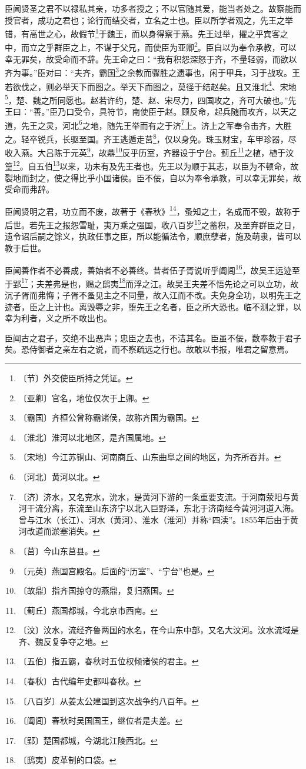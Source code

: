 \documentclass[12pt,UTF-8,openany,a4]{ctexbook}
\begin{document}
\begin{large}
    臣闻贤圣之君不以禄私其亲，功多者授之；不以官随其爱，能当者处之。故察能而授官者，成功之君也；论行而结交者，立名之士也。臣以所学者观之，先王之举错，有高世之心，故假节\footnote{〔节〕\yiwen 外交使臣所持之凭证。}于魏王，而以身得察于燕。先王过举，擢之乎宾客之中，而立之乎群臣之上，不谋于父兄，而使臣为亚卿\footnote{〔亚卿〕\yiwen 官名，地位仅次于上卿。}。臣自以为奉令承教，可以幸无罪矣，故受命而不辞。先王命之曰：“我有积怨深怒于齐，不量轻弱，而欲以齐为事。”臣对曰：“夫齐，霸国\footnote{〔霸国〕\yiwen 齐桓公曾称霸诸侯，故称齐国为霸国。}之余教而骤胜之遗事也，闲于甲兵，习于战攻。王若欲伐之，则必举天下而图之。举天下而图之，莫径于结赵矣。且又淮北\footnote{〔淮北〕\yiwen 淮河以北地区，是齐国属地。}、宋地\footnote{〔宋地〕\yiwen 今江苏铜山、河南商丘、山东曲阜之间的地区，为齐所吞并。}，楚、魏之所同愿也。赵若许约，楚、赵、宋尽力，四国攻之，齐可大破也。”先王曰：“善。”臣乃口受令，具符节，南使臣于赵。顾反命，起兵随而攻齐，以天之道，先王之灵，河北\footnote{〔河北〕\yiwen 黄河以北。}之地，随先王举而有之于济\footnote{〔济〕\yiwen 济水，又名兖水，沇水，是黄河下游的一条重要支流。于河南荥阳与黄河干流分离，东流至山东济宁以北入巨野泽，东北于济南经今黄河河道入海。曾与江水（长江）、河水（黄河）、淮水（淮河）并称“四渎”。1855年后由于黄河改道而淤塞消失。}上。济上之军奉令击齐，大胜之。轻卒锐兵，长驱至国。齐王逃遁走莒\footnote{〔莒〕\yiwen \yiwen 今山东莒县。}，仅以身免。珠玉财宝，车甲珍器，尽收入燕。大吕陈于元英\footnote{〔元英〕\yiwen 燕国宫殿名。后面的“历室”、“宁台”也是。}，故鼎\footnote{〔故鼎〕\yiwen 指齐国掠夺的燕鼎，复归燕国。}反乎历室，齐器设于宁台。蓟丘\footnote{〔蓟丘〕\yiwen 燕国都城，今北京市西南。}之植，植于汶篁\footnote{〔汶〕\yiwen 汶水，流经齐鲁两国的水名，在今山东中部，又名大汶河。汶水流域是齐、魏反复争夺之地。}。自五伯\footnote{〔五伯〕\yiwen 指五霸，春秋时五位权倾诸侯的君主。}以来，功未有及先王者也。先王以为顺于其志，以臣为不顿命，故裂地而封之，使之得比乎小国诸侯。臣不佞，自以为奉令承教，可以幸无罪矣，故受命而弗辞。
    
    臣闻贤明之君，功立而不废，故著于《春秋》\footnote{〔春秋〕\yiwen 古代编年史都叫春秋。}，蚤知之士，名成而不毁，故称于后世。若先王之报怨雪耻，夷万乘之强国，收八百岁\footnote{〔八百岁〕\yiwen 从姜太公建国到这次战争约八百年。}之蓄积，及至弃群臣之日，遗令诏后嗣之馀义，执政任事之臣，所以能循法令，顺庶孽者，施及萌隶，皆可以教于后世。
    
    臣闻善作者不必善成，善始者不必善终。昔者伍子胥说听乎阖闾\footnote{〔阖闾〕\yiwen 春秋时吴国国王，继位者是夫差。}，故吴王远迹至于郢\footnote{〔郢〕\yiwen 楚国都城，今湖北江陵西北。}；夫差弗是也，赐之鸱夷\footnote{〔鸱夷〕\yiwen 皮革制的口袋。}而浮之江。故吴王夫差不悟先论之可以立功，故沉子胥而弗悔；子胥不蚤见主之不同量，故入江而不改。夫免身全功，以明先王之迹者，臣之上计也。离毁辱之非，堕先王之名者，臣之所大恐也。临不测之罪，以幸为利者，义之所不敢出也。
    
    臣闻古之君子，交绝不出恶声；忠臣之去也，不洁其名。臣虽不佞，数奉教于君子矣。恐侍御者之亲左右之说，而不察疏远之行也。故敢以书报，唯君之留意焉。

\end{large}
\end{document}
